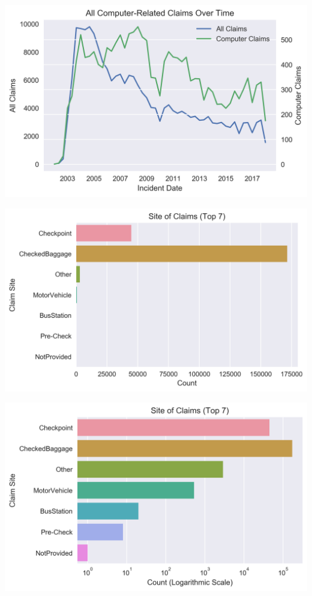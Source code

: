 \documentclass{beamer}
\begin{document}
\begin{frame}
	\includegraphics[keepaspectratio, width = \textwidth, height = \textheight]{../plots/computers}
\end{frame}

\begin{frame}
	\includegraphics[keepaspectratio, width = \textwidth, height = 0.5\textheight]{../plots/sites}
	\begin{flushright}
		\includegraphics[keepaspectratio, width = \textwidth, height = 0.5\textheight]{../plots/log_sites}
	\end{flushright}
\end{frame}
\end{document}
